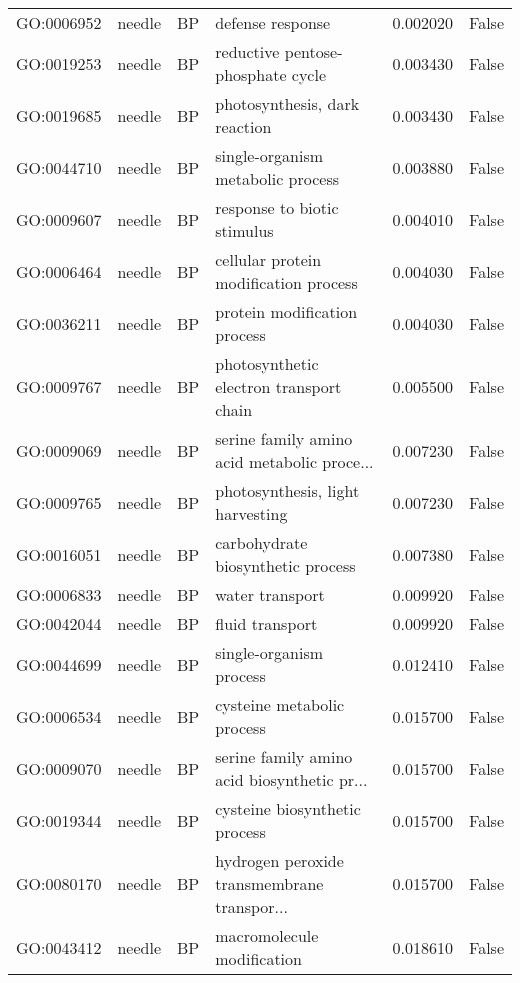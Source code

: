 \begin{longtable}{llllrl}
GO:0006952 & needle & BP &                              defense response  & 0.002020 &   False \\
GO:0019253 & needle & BP &             reductive pentose-phosphate cycle  & 0.003430 &   False \\
GO:0019685 & needle & BP &                 photosynthesis, dark reaction  & 0.003430 &   False \\
GO:0044710 & needle & BP &             single-organism metabolic process  & 0.003880 &   False \\
GO:0009607 & needle & BP &                   response to biotic stimulus  & 0.004010 &   False \\
GO:0006464 & needle & BP &         cellular protein modification process  & 0.004030 &   False \\
GO:0036211 & needle & BP &                  protein modification process  & 0.004030 &   False \\
GO:0009767 & needle & BP &       photosynthetic electron transport chain  & 0.005500 &   False \\
GO:0009069 & needle & BP &   serine family amino acid metabolic proce...  & 0.007230 &   False \\
GO:0009765 & needle & BP &              photosynthesis, light harvesting  & 0.007230 &   False \\
GO:0016051 & needle & BP &             carbohydrate biosynthetic process  & 0.007380 &   False \\
GO:0006833 & needle & BP &                               water transport  & 0.009920 &   False \\
GO:0042044 & needle & BP &                               fluid transport  & 0.009920 &   False \\
GO:0044699 & needle & BP &                       single-organism process  & 0.012410 &   False \\
GO:0006534 & needle & BP &                    cysteine metabolic process  & 0.015700 &   False \\
GO:0009070 & needle & BP &   serine family amino acid biosynthetic pr...  & 0.015700 &   False \\
GO:0019344 & needle & BP &                 cysteine biosynthetic process  & 0.015700 &   False \\
GO:0080170 & needle & BP &   hydrogen peroxide transmembrane transpor...  & 0.015700 &   False \\
GO:0043412 & needle & BP &                    macromolecule modification  & 0.018610 &   False \\

\end{longtable}
